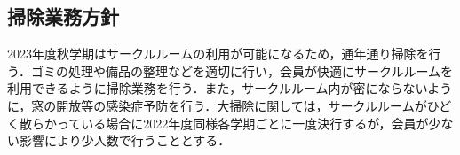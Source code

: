 \subsection*{掃除業務方針}

2023年度秋学期はサークルルームの利用が可能になるため，通年通り掃除を行う．ゴミの処理や備品の整理などを適切に行い，会員が快適にサークルルームを利用できるように掃除業務を行う．また，サークルルーム内が密にならないように，窓の開放等の感染症予防を行う．大掃除に関しては，サークルルームがひどく散らかっている場合に2022年度同様各学期ごとに一度決行するが，会員が少ない影響により少人数で行うこととする．


